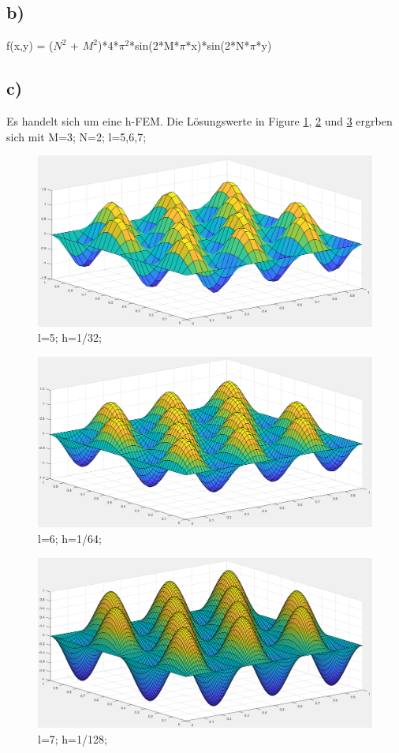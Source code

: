 \documentclass{article}
\begin{document}
	\subsection{b)}
	f(x,y) = ($N^2$ + $M^2$)*4*$\pi^2$*sin(2*M*$\pi$*x)*sin(2*N*$\pi$*y)
	\subsection{c)}
	Es handelt sich um eine h-FEM.  \newline
	Die Lösungswerte in Figure \ref{A5L5}, \ref{A5L6} und \ref{A5L7} ergrben sich mit M=3; N=2; l=5,6,7;  \newline
	\begin{figure}
		\includegraphics[width=\linewidth]{Aufgaben-Ressourcen/A5L5M3N2.png} 
		\caption{l=5; h=1/32;}
		\label{A5L5}
	\end{figure}
	\begin{figure}
		\includegraphics[width=\linewidth]{Aufgaben-Ressourcen/A5L6M3N2.png} 
		\caption{l=6; h=1/64;}
		\label{A5L6}
	\end{figure}
	\begin{figure}
		\includegraphics[width=\linewidth]{Aufgaben-Ressourcen/A5L7M3N2.png}
		\caption{l=7; h=1/128;}
		\label{A5L7}
	\end{figure}
\end{document}
